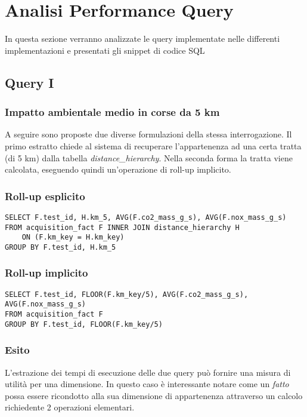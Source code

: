 \section{Analisi Performance Query}
In questa sezione verranno analizzate le query implementate nelle differenti implementazioni e presentati gli snippet di codice SQL

\subsection{Query I}
\subsubsection{Impatto ambientale medio in corse da 5 km}
A seguire sono proposte due diverse formulazioni della stessa interrogazione. Il primo estratto chiede al sistema di recuperare l'appartenenza ad una certa tratta (di 5 km) dalla tabella \textit{distance\_hierarchy}. Nella seconda forma la tratta viene calcolata, eseguendo quindi un'operazione di roll-up implicito.
\subsubsection{Roll-up esplicito}
\begin{lstlisting}[language=mySQL]
SELECT F.test_id, H.km_5, AVG(F.co2_mass_g_s), AVG(F.nox_mass_g_s)
FROM acquisition_fact F INNER JOIN distance_hierarchy H
	ON (F.km_key = H.km_key)
GROUP BY F.test_id, H.km_5
\end{lstlisting}

\subsubsection{Roll-up implicito}
\begin{lstlisting}[language=mySQL]
SELECT F.test_id, FLOOR(F.km_key/5), AVG(F.co2_mass_g_s), AVG(F.nox_mass_g_s)
FROM acquisition_fact F
GROUP BY F.test_id, FLOOR(F.km_key/5)
\end{lstlisting}

\subsubsection{Esito}
L'estrazione dei tempi di esecuzione delle due query può fornire una misura di utilità per una dimensione. In questo caso è interessante notare come un \textit{fatto} possa essere ricondotto alla sua dimensione di appartenenza attraverso un calcolo richiedente 2 operazioni elementari.

